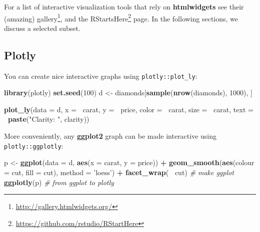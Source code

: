\documentclass[]{book}
\newenvironment{Shaded}{\begin{snugshade}}{\end{snugshade}}
\newcommand{\CommentTok}[1]{\textcolor[rgb]{0.56,0.35,0.01}{\textit{#1}}}
\newcommand{\DataTypeTok}[1]{\textcolor[rgb]{0.13,0.29,0.53}{#1}}
\newcommand{\DecValTok}[1]{\textcolor[rgb]{0.00,0.00,0.81}{#1}}
\newcommand{\KeywordTok}[1]{\textcolor[rgb]{0.13,0.29,0.53}{\textbf{#1}}}
\newcommand{\NormalTok}[1]{#1}
\newcommand{\OperatorTok}[1]{\textcolor[rgb]{0.81,0.36,0.00}{\textbf{#1}}}
\newcommand{\StringTok}[1]{\textcolor[rgb]{0.31,0.60,0.02}{#1}}
\renewcommand{\href}[2]{#2\footnote{\url{#1}}}
\theoremstyle{definition}
\theoremstyle{definition}
\theoremstyle{definition}
\theoremstyle{remark}
\begin{document}
For a list of interactive visualization tools that rely on \textbf{htmlwidgets} see \href{http://gallery.htmlwidgets.org/}{their (amazing) gallery}, and the \href{https://github.com/rstudio/RStartHere}{RStartsHere} page.
In the following sections, we discuss a selected subset.

\hypertarget{plotly}{%
\subsection{Plotly}\label{plotly}}

You can create nice interactive graphs using \texttt{plotly::plot\_ly}:

\begin{Shaded}
\begin{Highlighting}[]
\KeywordTok{library}\NormalTok{(plotly)}
\KeywordTok{set.seed}\NormalTok{(}\DecValTok{100}\NormalTok{)}
\NormalTok{d <-}\StringTok{ }\NormalTok{diamonds[}\KeywordTok{sample}\NormalTok{(}\KeywordTok{nrow}\NormalTok{(diamonds), }\DecValTok{1000}\NormalTok{), ]}
\end{Highlighting}
\end{Shaded}

\begin{Shaded}
\begin{Highlighting}[]
\KeywordTok{plot_ly}\NormalTok{(}\DataTypeTok{data =}\NormalTok{ d, }\DataTypeTok{x =} \OperatorTok{~}\NormalTok{carat, }\DataTypeTok{y =} \OperatorTok{~}\NormalTok{price, }\DataTypeTok{color =} \OperatorTok{~}\NormalTok{carat, }\DataTypeTok{size =} \OperatorTok{~}\NormalTok{carat, }\DataTypeTok{text =} \OperatorTok{~}\KeywordTok{paste}\NormalTok{(}\StringTok{"Clarity: "}\NormalTok{, clarity))}
\end{Highlighting}
\end{Shaded}

More conveniently, any \textbf{ggplot2} graph can be made interactive using \texttt{plotly::ggplotly}:

\begin{Shaded}
\begin{Highlighting}[]
\NormalTok{p <-}\StringTok{ }\KeywordTok{ggplot}\NormalTok{(}\DataTypeTok{data =}\NormalTok{ d, }\KeywordTok{aes}\NormalTok{(}\DataTypeTok{x =}\NormalTok{ carat, }\DataTypeTok{y =}\NormalTok{ price)) }\OperatorTok{+}
\StringTok{  }\KeywordTok{geom_smooth}\NormalTok{(}\KeywordTok{aes}\NormalTok{(}\DataTypeTok{colour =}\NormalTok{ cut, }\DataTypeTok{fill =}\NormalTok{ cut), }\DataTypeTok{method =} \StringTok{'loess'}\NormalTok{) }\OperatorTok{+}\StringTok{ }
\StringTok{  }\KeywordTok{facet_wrap}\NormalTok{(}\OperatorTok{~}\StringTok{ }\NormalTok{cut) }\CommentTok{# make ggplot}
\KeywordTok{ggplotly}\NormalTok{(p) }\CommentTok{# from ggplot to plotly}
\end{Highlighting}
\end{Shaded}
\end{document}
